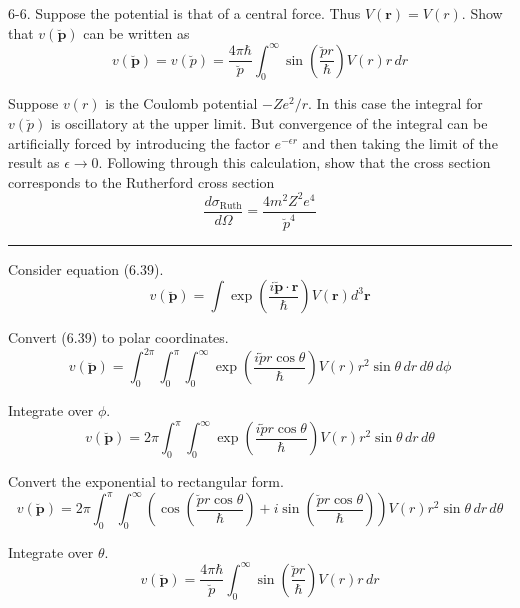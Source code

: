 \documentclass[12pt]{article}
\begin{document}
6-6.
Suppose the potential is that of a central force.
Thus $V(\mathbf r)=V(r)$.
Show that $v(\breve{\mathbf p})$ can be written as
\begin{equation*}
v(\breve{\mathbf p})=v(\breve p)=\frac{4\pi\hbar}{\breve p}
\int_0^\infty\sin\left(\frac{\breve pr}{\hbar}\right)V(r)r\,dr
\tag{6.45}
\end{equation*}

Suppose $v(r)$ is the Coulomb potential $-Ze^2/r$.
In this case the integral for $v(\breve p)$ is oscillatory at the upper limit.
But convergence of the integral can be artificially forced by
introducing the factor $e^{-\epsilon r}$ and then taking the limit
of the result as $\epsilon\rightarrow0$.
Following through this calculation,
show that the cross section corresponds to the Rutherford cross section
\begin{equation*}
\frac{d\sigma_\text{Ruth}}{d\Omega}
=\frac{4m^2Z^2e^4}{\breve p^4}
\tag{6.46}
\end{equation*}

\bigskip
\hrule

\bigskip
Consider equation (6.39).
\begin{equation*}
v(\breve{\mathbf p})=\int\exp\left(\frac{i\breve{\mathbf p}\cdot\mathbf r}{\hbar}\right)
V(\mathbf r)d^3\mathbf r
\tag{6.39}
\end{equation*}

Convert (6.39) to polar coordinates.
\begin{equation*}
v(\breve{\mathbf p})=\int_0^{2\pi}\int_0^\pi\int_0^\infty
\exp\left(\frac{i\breve pr\cos\theta}{\hbar}\right)
V(r)r^2\sin\theta\,dr\,d\theta\,d\phi
\end{equation*}

Integrate over $\phi$.
\begin{equation*}
v(\breve{\mathbf p})=2\pi\int_0^\pi\int_0^\infty
\exp\left(\frac{i\breve pr\cos\theta}{\hbar}\right)
V(r)r^2\sin\theta\,dr\,d\theta
\end{equation*}

Convert the exponential to rectangular form.
\begin{equation*}
v(\breve{\mathbf p})=2\pi\int_0^\pi\int_0^\infty
\left(\cos\left(\frac{\breve pr\cos\theta}{\hbar}\right)
+i\sin\left(\frac{\breve pr\cos\theta}{\hbar}\right)\right)
V(r)r^2\sin\theta\,dr\,d\theta
\end{equation*}

Integrate over $\theta$.
\begin{equation*}
v(\breve{\mathbf p})=\frac{4\pi\hbar}{\breve p}\int_0^\infty
\sin\left(\frac{\breve pr}{\hbar}\right)
V(r)r\,dr
\end{equation*}
\end{document}
